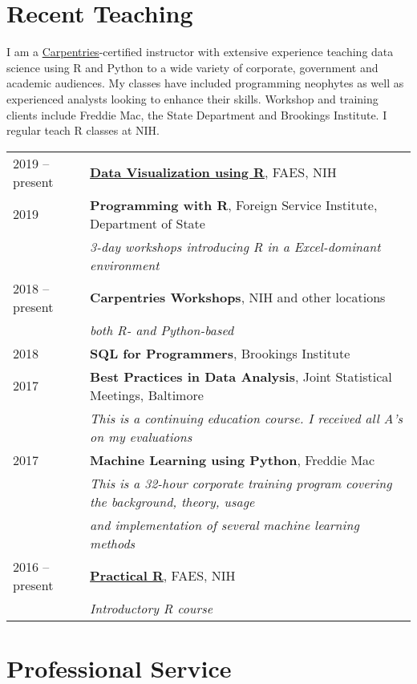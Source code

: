 \documentclass[11pt, a4paper]{awesome-cv}
\begin{document}
\newpage

\hypertarget{recent-teaching}{%
\section{Recent Teaching}\label{recent-teaching}}

I am a \href{https://www.carpentries.org}{Carpentries}-certified instructor with extensive experience
teaching data science using R and Python to a wide variety of corporate,
government and academic audiences. My classes have included programming neophytes as well as
experienced analysts looking to enhance their skills. Workshop and training clients include Freddie Mac, the State Department and Brookings Institute. I regular teach R classes at NIH.

\begin{tabular}{ll}
  2019 -- present & \href{http://www.araastat.com/BIOF439}{\textbf{Data Visualization using R}}, FAES, NIH \\ 
  2019 & \textbf{Programming with R}, Foreign Service Institute, Department of State \\ 
   & \emph{3-day workshops introducing R in a Excel-dominant environment} \\ 
  2018 -- present & \textbf{Carpentries Workshops}, NIH and other locations \\ 
   & \emph{both R- and Python-based} \\ 
  2018 & \textbf{SQL for Programmers}, Brookings Institute \\ 
  2017 & \textbf{Best Practices in Data Analysis}, Joint Statistical Meetings, Baltimore \\ 
   & \emph{This is a continuing education course. I received all A's on my evaluations} \\ 
  2017 & \textbf{Machine Learning using Python}, Freddie Mac \\ 
   & \emph{This is a 32-hour corporate training program covering the background, theory, usage } \\ 
   & \emph{and implementation of several machine learning methods} \\ 
  2016 -- present & \href{http://www.araastat.com/BIOF339_PracticalR}{\textbf{Practical R}}, FAES, NIH \\ 
   & \emph{Introductory R course} \\ 
  \end{tabular}

\hypertarget{professional-service}{%
\section{Professional Service}\label{professional-service}}
\end{document}
